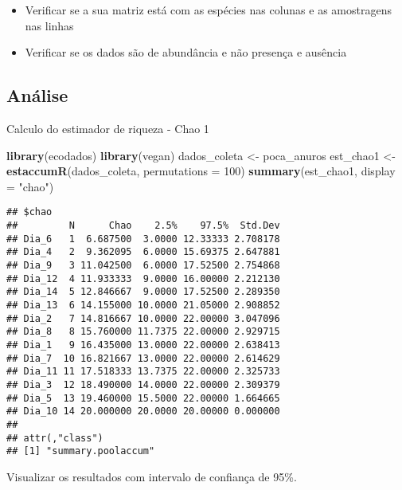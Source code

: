 \documentclass[
]{book}
\newenvironment{Shaded}{\begin{snugshade}}{\end{snugshade}}
\newcommand{\DataTypeTok}[1]{\textcolor[rgb]{0.13,0.29,0.53}{#1}}
\newcommand{\DecValTok}[1]{\textcolor[rgb]{0.00,0.00,0.81}{#1}}
\newcommand{\KeywordTok}[1]{\textcolor[rgb]{0.13,0.29,0.53}{\textbf{#1}}}
\newcommand{\NormalTok}[1]{#1}
\newcommand{\StringTok}[1]{\textcolor[rgb]{0.31,0.60,0.02}{#1}}
\providecommand{\tightlist}{%
  \setlength{\itemsep}{0pt}\setlength{\parskip}{0pt}}
\begin{document}
\begin{itemize}
\tightlist
\item
  Verificar se a sua matriz está com as espécies nas colunas e as amostragens nas linhas
\item
  Verificar se os dados são de abundância e não presença e ausência
\end{itemize}

\hypertarget{anuxe1lise-2}{%
\subsection{Análise}\label{anuxe1lise-2}}

Calculo do estimador de riqueza - Chao 1

\begin{Shaded}
\begin{Highlighting}[]
\KeywordTok{library}\NormalTok{(ecodados)}
\KeywordTok{library}\NormalTok{(vegan)}
\NormalTok{dados_coleta <-}\StringTok{ }\NormalTok{poca_anuros}
\NormalTok{est_chao1 <-}\StringTok{ }\KeywordTok{estaccumR}\NormalTok{(dados_coleta, }\DataTypeTok{permutations =} \DecValTok{100}\NormalTok{)}
\KeywordTok{summary}\NormalTok{(est_chao1, }\DataTypeTok{display =} \StringTok{"chao"}\NormalTok{)}
\end{Highlighting}
\end{Shaded}

\begin{verbatim}
## $chao
##         N      Chao    2.5%    97.5%  Std.Dev
## Dia_6   1  6.687500  3.0000 12.33333 2.708178
## Dia_4   2  9.362095  6.0000 15.69375 2.647881
## Dia_9   3 11.042500  6.0000 17.52500 2.754868
## Dia_12  4 11.933333  9.0000 16.00000 2.212130
## Dia_14  5 12.846667  9.0000 17.52500 2.289350
## Dia_13  6 14.155000 10.0000 21.05000 2.908852
## Dia_2   7 14.816667 10.0000 22.00000 3.047096
## Dia_8   8 15.760000 11.7375 22.00000 2.929715
## Dia_1   9 16.435000 13.0000 22.00000 2.638413
## Dia_7  10 16.821667 13.0000 22.00000 2.614629
## Dia_11 11 17.518333 13.7375 22.00000 2.325733
## Dia_3  12 18.490000 14.0000 22.00000 2.309379
## Dia_5  13 19.460000 15.5000 22.00000 1.664665
## Dia_10 14 20.000000 20.0000 20.00000 0.000000
## 
## attr(,"class")
## [1] "summary.poolaccum"
\end{verbatim}

Visualizar os resultados com intervalo de confiança de 95\%.
\end{document}
